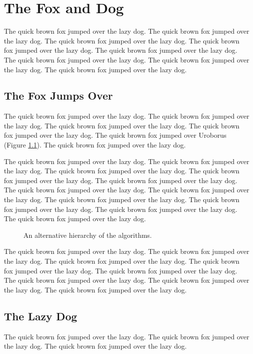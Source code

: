\documentclass{l4proj}
\begin{document}
\chapter{The Fox and Dog}
The quick brown fox jumped over the lazy dog.
The quick brown fox jumped over the lazy dog.
The quick brown fox jumped over the lazy dog.
The quick brown fox jumped over the lazy dog.
The quick brown fox jumped over the lazy dog.
The quick brown fox jumped over the lazy dog.
The quick brown fox jumped over the lazy dog.
The quick brown fox jumped over the lazy dog.

\section{The Fox Jumps Over}
The quick brown fox jumped over the lazy dog.
The quick brown fox jumped over the lazy dog.
The quick brown fox jumped over the lazy dog.
The quick brown fox jumped over the lazy dog.
The quick brown fox jumped over Uroborus (Figure \ref{uroborus}).
The quick brown fox jumped over the lazy dog.

The quick brown fox jumped over the lazy dog.
The quick brown fox jumped over the lazy dog.
The quick brown fox jumped over the lazy dog.
The quick brown fox jumped over the lazy dog.
The quick brown fox jumped over the lazy dog.
The quick brown fox jumped over the lazy dog.
The quick brown fox jumped over the lazy dog.
The quick brown fox jumped over the lazy dog.
The quick brown fox jumped over the lazy dog.
The quick brown fox jumped over the lazy dog.
The quick brown fox jumped over the lazy dog.

\begin{figure}
\centering
\vspace{-30mm}
\caption{An alternative hierarchy of the algorithms.}
\label{uroborus}
\end{figure}

The quick brown fox jumped over the lazy dog.
The quick brown fox jumped over the lazy dog.
The quick brown fox jumped over the lazy dog.
The quick brown fox jumped over \cite{ckt} the lazy dog.
The quick brown fox jumped over the lazy dog.
The quick brown fox jumped over the lazy dog.
The quick brown fox jumped over the lazy dog.
The quick brown fox jumped over the lazy dog.

\section{The Lazy Dog}
The quick brown fox jumped over the lazy dog.
The quick brown fox jumped over the lazy dog.
The quick brown fox jumped over the lazy dog.
\end{document}
